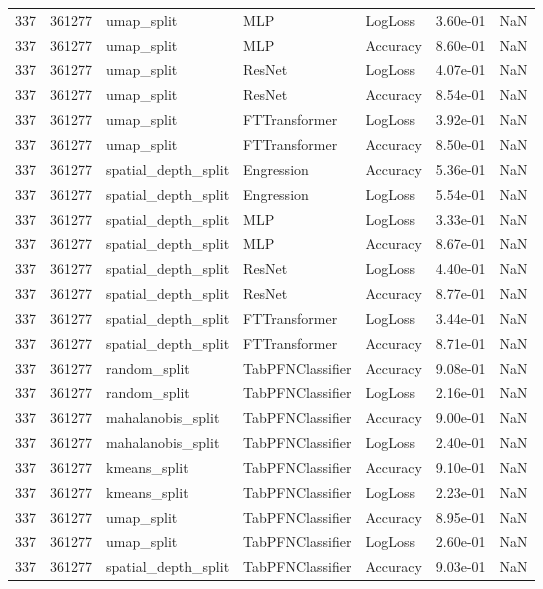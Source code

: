 \begin{tabular}{rrlllrr}
337 & 361277 & umap\_split & MLP & LogLoss & 3.60e-01 & NaN \\
337 & 361277 & umap\_split & MLP & Accuracy & 8.60e-01 & NaN \\
337 & 361277 & umap\_split & ResNet & LogLoss & 4.07e-01 & NaN \\
337 & 361277 & umap\_split & ResNet & Accuracy & 8.54e-01 & NaN \\
337 & 361277 & umap\_split & FTTransformer & LogLoss & 3.92e-01 & NaN \\
337 & 361277 & umap\_split & FTTransformer & Accuracy & 8.50e-01 & NaN \\
337 & 361277 & spatial\_depth\_split & Engression & Accuracy & 5.36e-01 & NaN \\
337 & 361277 & spatial\_depth\_split & Engression & LogLoss & 5.54e-01 & NaN \\
337 & 361277 & spatial\_depth\_split & MLP & LogLoss & 3.33e-01 & NaN \\
337 & 361277 & spatial\_depth\_split & MLP & Accuracy & 8.67e-01 & NaN \\
337 & 361277 & spatial\_depth\_split & ResNet & LogLoss & 4.40e-01 & NaN \\
337 & 361277 & spatial\_depth\_split & ResNet & Accuracy & 8.77e-01 & NaN \\
337 & 361277 & spatial\_depth\_split & FTTransformer & LogLoss & 3.44e-01 & NaN \\
337 & 361277 & spatial\_depth\_split & FTTransformer & Accuracy & 8.71e-01 & NaN \\
337 & 361277 & random\_split & TabPFNClassifier & Accuracy & 9.08e-01 & NaN \\
337 & 361277 & random\_split & TabPFNClassifier & LogLoss & 2.16e-01 & NaN \\
337 & 361277 & mahalanobis\_split & TabPFNClassifier & Accuracy & 9.00e-01 & NaN \\
337 & 361277 & mahalanobis\_split & TabPFNClassifier & LogLoss & 2.40e-01 & NaN \\
337 & 361277 & kmeans\_split & TabPFNClassifier & Accuracy & 9.10e-01 & NaN \\
337 & 361277 & kmeans\_split & TabPFNClassifier & LogLoss & 2.23e-01 & NaN \\
337 & 361277 & umap\_split & TabPFNClassifier & Accuracy & 8.95e-01 & NaN \\
337 & 361277 & umap\_split & TabPFNClassifier & LogLoss & 2.60e-01 & NaN \\
337 & 361277 & spatial\_depth\_split & TabPFNClassifier & Accuracy & 9.03e-01 & NaN \\

\end{tabular}
